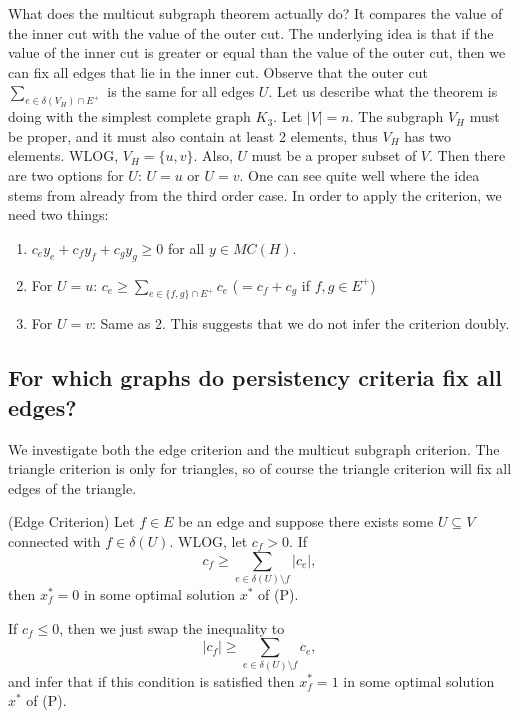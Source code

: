 What does the multicut subgraph theorem actually do? It
compares the value of the inner cut with the value of the outer cut. The underlying idea is that if the value of the inner cut is greater or equal than the value of the outer cut, then we can fix all edges that lie in the inner cut. 
Observe that the outer cut $\sum_{e \in \delta(V_H) \cap E^+}$ is the same for all edges $U$. Let us describe what the theorem is doing with the simplest complete graph $K_3$. Let $|V|=n$. The subgraph $V_H$ must be proper, and it must also contain at least 2 elements, thus $V_H$ has two elements. WLOG, $V_H=\{u,v\}$. Also, $U$ must be a proper subset of $V$. Then there are two options for $U$: $U=u$ or $U=v$. One can see quite well where the idea stems from already from the third order case. In order to apply the criterion, we need two things: \begin{enumerate}
    \item $c_e y_e + c_f y_f +c_g y_g \geq 0$ for all $y \in MC(H)$.
    \item For $U=u$: $c_e \geq \sum_{e \in \{f,g\} \cap E^+} c_e$ ($=c_f +c_g$ if $f,g \in E^+$)
    \item For $U=v$: Same as 2. This suggests that we do not infer the criterion doubly. 
\end{enumerate}
   
\subsection{For which graphs do persistency criteria fix all edges?}
We investigate both the edge criterion and the multicut subgraph criterion. The triangle criterion is only for triangles, so of course the triangle criterion will fix all edges of the triangle.
\begin{theorem}{(Edge Criterion)}
Let $f \in E$ be an edge and suppose there exists some $U \subseteq V$ connected with $f \in \delta(U)$. WLOG, let $c_f >0$. If 
\[ c_f \geq \sum_{e \in \delta(U) \setminus f} |c_e|, \] 
then $x^*_f=0$ in some optimal solution $x^*$ of (P). 
\end{theorem}
If $c_f \leq 0$, then we just swap the inequality to \[ |c_f| \geq \sum_{e \in \delta(U) \setminus f} c_e, \] and infer that if this condition is satisfied then $x^*_f=1$ in some optimal solution $x^*$ of (P). 

